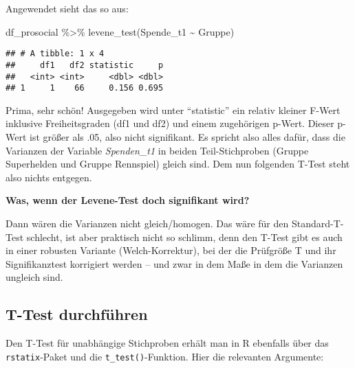 \documentclass[
]{book}
\newenvironment{Shaded}{\begin{snugshade}}{\end{snugshade}}
\newcommand{\FunctionTok}[1]{\textcolor[rgb]{0.00,0.00,0.00}{#1}}
\newcommand{\NormalTok}[1]{#1}
\newcommand{\SpecialCharTok}[1]{\textcolor[rgb]{0.00,0.00,0.00}{#1}}
\begin{document}
Angewendet sieht das so aus:

\begin{Shaded}
\begin{Highlighting}[]
\NormalTok{df\_prosocial }\SpecialCharTok{\%\textgreater{}\%} 
  \FunctionTok{levene\_test}\NormalTok{(Spende\_t1 }\SpecialCharTok{\textasciitilde{}}\NormalTok{ Gruppe)}
\end{Highlighting}
\end{Shaded}

\begin{verbatim}
## # A tibble: 1 x 4
##     df1   df2 statistic     p
##   <int> <int>     <dbl> <dbl>
## 1     1    66     0.156 0.695
\end{verbatim}

Prima, sehr schön! Ausgegeben wird unter ``statistic'' ein relativ kleiner F-Wert inklusive Freiheitsgraden (df1 und df2) und einem zugehörigen p-Wert. Dieser p-Wert ist größer als .05, also nicht signifikant. Es spricht also alles dafür, dass die Varianzen der Variable \emph{Spenden\_t1} in beiden Teil-Stichproben (Gruppe Superhelden und Gruppe Rennspiel) gleich sind. Dem nun folgenden T-Test steht also nichts entgegen.

\leavevmode\hypertarget{info_varianzhetero}{}%
\textbf{Was, wenn der Levene-Test doch signifikant wird?}

Dann wären die Varianzen nicht gleich/homogen. Das wäre für den Standard-T-Test schlecht, ist aber praktisch nicht so schlimm, denn den T-Test gibt es auch in einer robusten Variante (Welch-Korrektur), bei der die Prüfgröße T und ihr Signifikanztest korrigiert werden -- und zwar in dem Maße in dem die Varianzen ungleich sind.

\hypertarget{t-test-durchfuxfchren-1}{%
\subsection{T-Test durchführen}\label{t-test-durchfuxfchren-1}}

Den T-Test für unabhängige Stichproben erhält man in R ebenfalls über das \texttt{rstatix}-Paket und die \texttt{t\_test()}-Funktion. Hier die relevanten Argumente:
\end{document}
